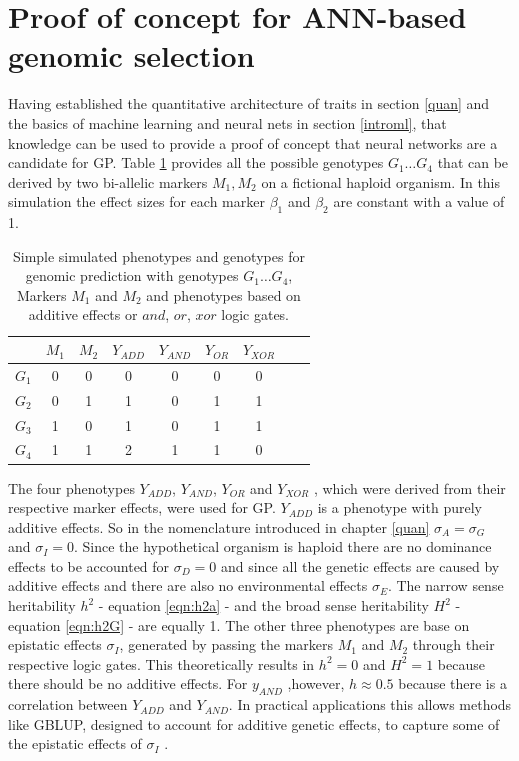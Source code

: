 \section{Proof of concept for ANN-based genomic selection} \label{POC}

Having established the quantitative architecture of traits in section \ref{quan} and the
basics of machine learning and neural nets in section \ref{introml}, that knowledge can be
used to provide a proof of concept that neural networks are a candidate for GP. Table
\ref{tab:simmarker} provides all the possible genotypes $G_1 \dots G_4$ that can be
derived by two bi-allelic markers $M_1,M_2$ on a fictional haploid organism. In this
simulation the effect sizes for each marker $\beta_1$ and $\beta_2$ are constant with a
value of 1.

\begin{table}[H]
  \caption{Simple simulated phenotypes and genotypes for genomic prediction with genotypes
    $G_1 \dots G_4$, Markers $M_1$ and $M_2$ and phenotypes based on additive effects or
    $and$, $or$, $xor$ logic gates.}
\label{tab:simmarker}
\centering
\begin{tabular}{ l c c | c c c c c c }
 \toprule
 & $M_1$ & $M_2$ & $Y_{ADD}$ & $Y_{AND}$ & $Y_{OR}$ & $Y_{XOR}$\\
 \midrule
 $G_1$ & 0 & 0 & 0 & 0 & 0 & 0 \\
 $G_2$ & 0 & 1 & 1 & 0 & 1 & 1 \\
 $G_3$ & 1 & 0 & 1 & 0 & 1 & 1 \\
 $G_4$ & 1 & 1 & 2 & 1 & 1 & 0 \\
 \bottomrule
\end{tabular}
\end{table}

The four phenotypes $Y_{ADD}$, $Y_{AND}$, $Y_{OR}$ and $Y_{XOR}$ , which were derived from
their respective marker effects, were used for GP. $Y_{ADD}$ is a phenotype with purely
additive effects. So in the nomenclature introduced in chapter \ref{quan}
$\sigma_A = \sigma_G$ and $\sigma_{I} = 0$. Since the hypothetical organism is haploid
there are no dominance effects to be accounted for $\sigma_D = 0$ and since all the
genetic effects are caused by additive effects and there are also no environmental effects
$\sigma_E$.  The narrow sense heritability $h^2$ - equation \ref{eqn:h2a} - and the broad
sense heritability $H^2$ - equation \ref{eqn:h2G} - are equally 1. The other three
phenotypes are base on epistatic effects $\sigma_I$, generated by passing the markers
$M_1$ and $M_2$ through their respective logic gates. This theoretically results in
$h^2 = 0$ and $H^2 = 1$ because there should be no additive effects. For $y_{AND}$
,however, $h \approx 0.5$ because there is a correlation between $Y_{ADD}$ and
$Y_{AND}$. In practical applications this allows methods like GBLUP, designed to account
for additive genetic effects, to capture some of the epistatic effects of $\sigma_I$
\cite{vieira2017assessing}.

